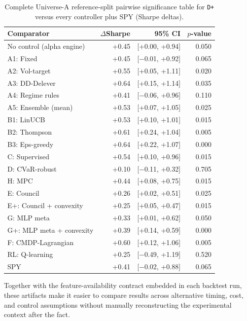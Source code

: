 \documentclass[10pt,twocolumn]{article}
\begin{document}
\begin{table}[t]
\centering
\small
\caption{Complete Universe-A reference-split pairwise significance table for
\texttt{D+} versus every controller plus SPY (Sharpe deltas).}
\label{tab:dplus_significance_full}
\begin{tabular}{@{} l r r r @{}}
\toprule
\textbf{Comparator} & \textbf{$\Delta$Sharpe} & \textbf{95\% CI} & \textbf{$p$-value} \\
\midrule
No control (alpha engine) & +0.45 & [+0.00, +0.94] & 0.050 \\
A1: Fixed & +0.45 & [$-$0.01, +0.92] & 0.065 \\
A2: Vol-target & +0.55 & [+0.05, +1.11] & 0.020 \\
A3: DD-Delever & +0.64 & [+0.15, +1.14] & 0.035 \\
A4: Regime rules & +0.41 & [$-$0.06, +0.96] & 0.110 \\
A5: Ensemble (mean) & +0.53 & [+0.07, +1.05] & 0.025 \\
B1: LinUCB & +0.53 & [+0.10, +1.01] & 0.015 \\
B2: Thompson & +0.61 & [+0.24, +1.04] & 0.005 \\
B3: Eps-greedy & +0.64 & [+0.22, +1.07] & 0.000 \\
C: Supervised & +0.54 & [+0.10, +0.96] & 0.015 \\
D: CVaR-robust & +0.10 & [$-$0.11, +0.32] & 0.705 \\
H: MPC & +0.44 & [+0.08, +0.75] & 0.015 \\
E: Council & +0.26 & [+0.02, +0.51] & 0.025 \\
E+: Council + convexity & +0.25 & [+0.05, +0.47] & 0.015 \\
G: MLP meta & +0.33 & [+0.01, +0.62] & 0.050 \\
G+: MLP meta + convexity & +0.39 & [+0.14, +0.59] & 0.000 \\
F: CMDP-Lagrangian & +0.60 & [+0.12, +1.06] & 0.005 \\
RL: Q-learning & +0.25 & [$-$0.49, +1.19] & 0.520 \\
SPY & +0.41 & [$-$0.02, +0.88] & 0.065 \\
\bottomrule
\end{tabular}
\end{table}


Together with the feature-availability contract embedded in each backtest run,
these artifacts make it easier to compare results across alternative timing,
cost, and control assumptions without manually reconstructing the experimental
context after the fact.
\end{document}
